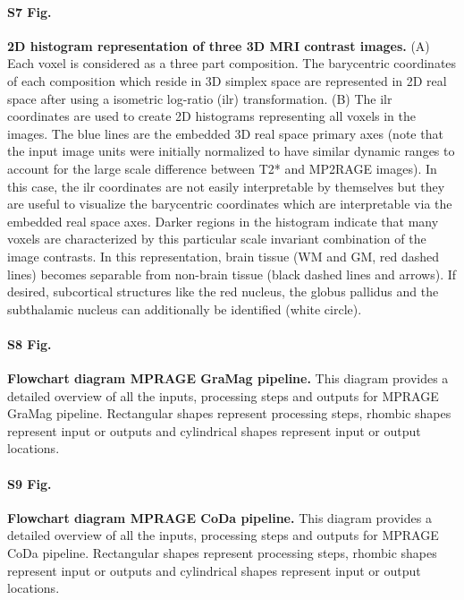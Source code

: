 \paragraph{S7 Fig.}
\label{S7_Fig}
{\bf 2D histogram representation of three 3D MRI contrast images.} (A) Each voxel is considered as a three part composition. The barycentric coordinates of each composition which reside in 3D simplex space are represented in 2D real space after using a isometric log-ratio (ilr) transformation. (B) The ilr coordinates are used to create 2D histograms representing all voxels in the images. The blue lines are the embedded 3D real space primary axes (note that the input image units were initially normalized to have similar dynamic ranges to account for the large scale difference between T2* and MP2RAGE images). In this case, the ilr coordinates are not easily interpretable by themselves but they are useful to visualize the barycentric coordinates which are interpretable via the embedded real space axes. Darker regions in the histogram indicate that many voxels are characterized by this particular scale invariant combination of the image contrasts. In this representation, brain tissue (WM and GM, red dashed lines) becomes separable from non-brain tissue (black dashed lines and arrows). If desired, subcortical structures like the red nucleus, the globus pallidus and the subthalamic nucleus can additionally be identified (white circle).

\paragraph{S8 Fig.}
\label{S8_Fig}
{\bf Flowchart diagram MPRAGE GraMag pipeline.} This diagram provides a detailed overview of all the inputs, processing steps and outputs for MPRAGE GraMag pipeline. Rectangular shapes represent processing steps, rhombic shapes represent input or outputs and cylindrical shapes represent input or output locations.

\paragraph{S9 Fig.}
\label{S9_Fig}
{\bf Flowchart diagram MPRAGE CoDa pipeline.} This diagram provides a detailed overview of all the inputs, processing steps and outputs for MPRAGE CoDa pipeline. Rectangular shapes represent processing steps, rhombic shapes represent input or outputs and cylindrical shapes represent input or output locations.

